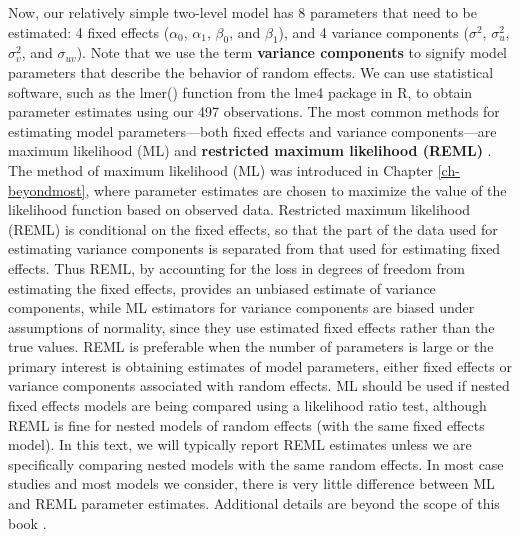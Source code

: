 \documentclass[
]{krantz}
\begin{document}
Now, our relatively simple two-level model has 8 parameters that need to be estimated: 4 fixed effects (\(\alpha_{0}\), \(\alpha_{1}\), \(\beta_{0}\), and \(\beta_{1}\)), and 4 variance components (\(\sigma^{2}\), \(\sigma_{u}^{2}\), \(\sigma_{v}^{2}\), and \(\sigma_{uv}\)). Note that we use the term \textbf{variance components}  to signify model parameters that describe the behavior of random effects. We can use statistical software, such as the lmer() function from the lme4 package in R, to obtain parameter estimates using our 497 observations. The most common methods for estimating model parameters---both fixed effects and variance components---are maximum likelihood (ML) and \textbf{restricted maximum likelihood (REML)} . The method of maximum likelihood (ML) was introduced in Chapter \ref{ch-beyondmost}, where parameter estimates are chosen to maximize the value of the likelihood function based on observed data. Restricted maximum likelihood (REML) is conditional on the fixed effects, so that the part of the data used for estimating variance components is separated from that used for estimating fixed effects. Thus REML, by accounting for the loss in degrees of freedom from estimating the fixed effects, provides an unbiased estimate of variance components, while ML estimators for variance components are biased under assumptions of normality, since they use estimated fixed effects rather than the true values. REML is preferable when the number of parameters is large or the primary interest is obtaining estimates of model parameters, either fixed effects or variance components associated with random effects. ML should be used if nested fixed effects models are being compared using a likelihood ratio test, although REML is fine for nested models of random effects (with the same fixed effects model). In this text, we will typically report REML estimates unless we are specifically comparing nested models with the same random effects. In most case studies and most models we consider, there is very little difference between ML and REML parameter estimates. Additional details are beyond the scope of this book \citep{Singer2003}.
\end{document}
